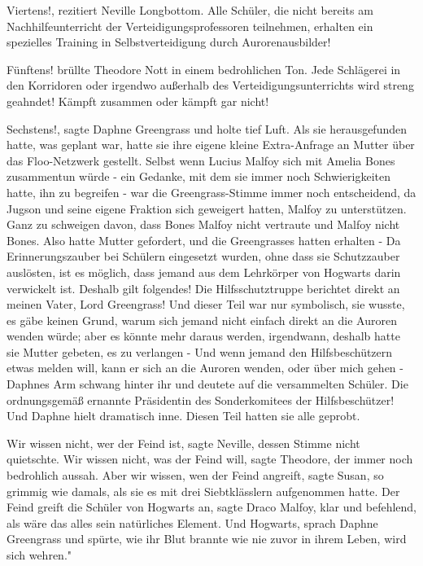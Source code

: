 \glqq{}Viertens!\grqq{}, rezitiert Neville Longbottom. \glqq{}Alle Schüler, die
nicht bereits am Nachhilfeunterricht der Verteidigungsprofessoren teilnehmen,
erhalten ein spezielles Training in Selbstverteidigung durch
Aurorenausbilder!\grqq{}

\glqq{}Fünftens!\grqq{} brüllte Theodore Nott in einem bedrohlichen Ton. \glqq{}
Jede Schlägerei in den Korridoren oder irgendwo außerhalb des
Verteidigungsunterrichts wird streng geahndet! Kämpft zusammen oder kämpft gar
nicht!\grqq{}

\glqq{}Sechstens!\grqq{}, sagte Daphne Greengrass und holte tief Luft. Als sie
herausgefunden hatte, was geplant war, hatte sie ihre eigene kleine
Extra-Anfrage an Mutter über das Floo-Netzwerk gestellt. Selbst wenn Lucius
Malfoy sich mit Amelia Bones zusammentun würde - ein Gedanke, mit dem sie immer
noch Schwierigkeiten hatte, ihn zu begreifen - war die Greengrass-Stimme immer
noch entscheidend, da Jugson und seine eigene Fraktion sich geweigert hatten,
Malfoy zu unterstützen. Ganz zu schweigen davon, dass Bones Malfoy nicht
vertraute und Malfoy nicht Bones. Also hatte Mutter gefordert, und die
Greengrasses hatten erhalten - \glqq{}Da Erinnerungszauber bei Schülern
eingesetzt wurden, ohne dass sie Schutzzauber auslösten, ist es möglich, dass
jemand aus dem Lehrkörper von Hogwarts darin verwickelt ist. Deshalb gilt
folgendes! Die Hilfsschutztruppe berichtet direkt an meinen Vater, Lord
Greengrass!\grqq{} Und dieser Teil war nur symbolisch, sie wusste, es gäbe
keinen Grund, warum sich jemand nicht einfach direkt an die Auroren wenden
würde; aber es könnte mehr daraus werden, irgendwann, deshalb hatte sie Mutter
gebeten, es zu verlangen - \glqq{}Und wenn jemand den Hilfsbeschützern etwas
melden will, kann er sich an die Auroren wenden, oder über mich gehen -\grqq{}
Daphnes Arm schwang hinter ihr und deutete auf die versammelten Schüler. \glqq{}
Die ordnungsgemäß ernannte Präsidentin des Sonderkomitees der
Hilfsbeschützer!\grqq{} Und Daphne hielt dramatisch inne. Diesen Teil hatten sie
alle geprobt.

\glqq{}Wir wissen nicht, wer der Feind ist\grqq{}, sagte Neville, dessen Stimme
nicht quietschte. \glqq{}Wir wissen nicht, was der Feind will\grqq{}, sagte
Theodore, der immer noch bedrohlich aussah. \glqq{}Aber wir wissen, wen der Feind
angreift\grqq{}, sagte Susan, so grimmig wie damals, als sie es mit drei
Siebtklässlern aufgenommen hatte. \glqq{}Der Feind greift die Schüler von
Hogwarts an\grqq{}, sagte Draco Malfoy, klar und befehlend, als wäre das alles
sein natürliches Element. \glqq{}Und Hogwarts\grqq{}, sprach Daphne Greengrass
und spürte, wie ihr Blut brannte wie nie zuvor in ihrem Leben, \glqq{}wird sich
wehren."

